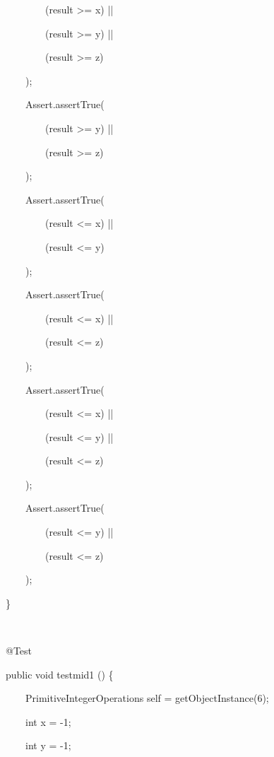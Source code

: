 \documentclass{article}
\newenvironment{tmindent}{\begin{tmparmod}{1.5em}{0pt}{0pt} }{\end{tmparmod}}
\newenvironment{tmparmod}[3]{\begin{list}{}{\setlength{\topsep}{0pt}\setlength{\leftmargin}{#1}\setlength{\rightmargin}{#2}\setlength{\parindent}{#3}\setlength{\listparindent}{\parindent}\setlength{\itemindent}{\parindent}\setlength{\parsep}{\parskip}} \item[]}{\end{list}}
\newenvironment{tmparsep}[1]{\begingroup\setlength{\parskip}{#1}}{\endgroup}
\begin{document}
\begin{example}
\begin{tmindent}
\begin{tmparsep}{0em}
      \ \ \ \ \ \ \ \ \ \ \ (result >= x) ||
      
      \ \ \ \ \ \ \ \ \ \ \ (result >= y) ||
      
      \ \ \ \ \ \ \ \ \ \ \ (result >= z)
      
      \ \ \ \ \ \ \ );
      
      \ \ \ \ \ \ \ Assert.assertTrue(
      
      \ \ \ \ \ \ \ \ \ \ \ (result >= y) ||
      
      \ \ \ \ \ \ \ \ \ \ \ (result >= z)
      
      \ \ \ \ \ \ \ );
      
      \ \ \ \ \ \ \ Assert.assertTrue(
      
      \ \ \ \ \ \ \ \ \ \ \ (result <= x) ||
      
      \ \ \ \ \ \ \ \ \ \ \ (result <= y)
      
      \ \ \ \ \ \ \ );
      
      \ \ \ \ \ \ \ Assert.assertTrue(
      
      \ \ \ \ \ \ \ \ \ \ \ (result <= x) ||
      
      \ \ \ \ \ \ \ \ \ \ \ (result <= z)
      
      \ \ \ \ \ \ \ );
      
      \ \ \ \ \ \ \ Assert.assertTrue(
      
      \ \ \ \ \ \ \ \ \ \ \ (result <= x) ||
      
      \ \ \ \ \ \ \ \ \ \ \ (result <= y) ||
      
      \ \ \ \ \ \ \ \ \ \ \ (result <= z)
      
      \ \ \ \ \ \ \ );
      
      \ \ \ \ \ \ \ Assert.assertTrue(
      
      \ \ \ \ \ \ \ \ \ \ \ (result <= y) ||
      
      \ \ \ \ \ \ \ \ \ \ \ (result <= z)
      
      \ \ \ \ \ \ \ );
      
      \ \ \ \}
      
      \ \ \
      
      \ \ \ @Test
      
      \ \ \ public void testmid1 () \{
      
      \ \ \ \ \ \ \ PrimitiveIntegerOperations self = getObjectInstance(6);
      
      \ \ \ \ \ \ \ int x = -1;
      
      \ \ \ \ \ \ \ int y = -1;
      

\end{tmparsep}
\end{tmindent}
\end{example}
\end{document}
